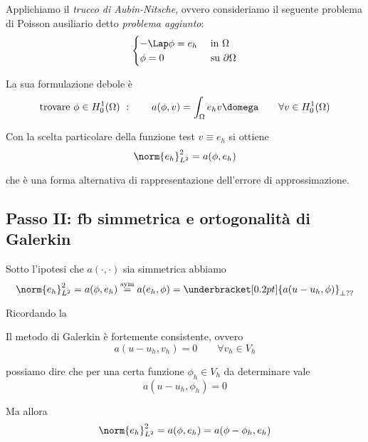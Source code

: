 Applichiamo il \emph{trucco di Aubin-Nitsche}, ovvero consideriamo il seguente problema di Poisson ausiliario detto \emph{problema aggiunto}:
\begin{equation*}
\begin{cases}
-\Lap \phi=e_h &\text{ in }\Omega \\
\phi=0 &\text{ su }\partial\Omega
\end{cases}
\end{equation*}

La sua formulazione debole è
\begin{equation*}
\text{trovare }\phi\in H^1_0(\Omega)\ :\qquad a(\phi,v)=\int_\Omega e_h v \domega \qquad \forall v\in H^1_0(\Omega)
\end{equation*}

Con la scelta particolare della funzione test $v\equiv e_h$ si ottiene
\begin{equation*}
\norm{e_h}^2_{L^2}=a(\phi,e_h)
\end{equation*}

che è una forma alternativa di rappresentazione dell'errore di approssimazione.

\subsection*{Passo II: fb simmetrica e ortogonalità di Galerkin}

Sotto l'ipotesi che $a(\cdot,\cdot)$ sia simmetrica abbiamo
\begin{equation*}
\norm{e_h}^2_{L^2}=a(\phi,e_h)\overset{\text{sym}}{=}a(e_h,\phi)=\underbracket[0.2pt]{a(u-u_h,\phi)}_{\perp \text{??}}
\end{equation*}

Ricordando la
\begin{propriet}
Il metodo di Galerkin è fortemente consistente, ovvero
\begin{equation*}
a(u-u_h,v_h)=0\qquad\forall v_h\in V_h
\end{equation*}
\end{propriet}

possiamo dire che per una certa funzione $\phi_h\in V_h$ da determinare vale
\begin{equation*}
a(u-u_h,\phi_h)=0
\end{equation*}

Ma allora
\begin{equation*}
\norm{e_h}^2_{L^2}=a(\phi,e_h)=a(\phi-\phi_h,e_h)
\end{equation*}

